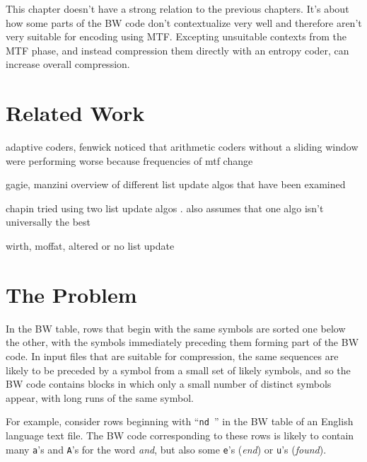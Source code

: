 \documentclass[a4paper]{scrreprt}
\begin{document}

This chapter doesn't have a strong relation to the previous chapters. It's about
how some parts of the BW code don't contextualize very well and therefore aren't
very suitable for encoding using MTF. Excepting unsuitable contexts from the MTF
phase, and instead compression them directly with an entropy coder, can increase
overall compression.

\section{Related Work}

adaptive coders, fenwick noticed that arithmetic coders without a sliding window
were performing worse because frequencies of mtf change\cite{fenwick1996block}

gagie, manzini overview of different list update algos that have been
examined\cite{gagie2007listupdate}

chapin tried using two list update algos
\cite{chapin2000switching,chapin2001diss}. also assumes that one algo isn't
universally the best

wirth, moffat, altered or no list update \cite{wirth2001ranks}

\section{The Problem}


In the BW table, rows that begin with the same symbols are sorted one below the
other, with the symbols immediately preceding them forming part of the BW code.
In input files that are suitable for compression, the same sequences are likely
to be preceded by a symbol from a small set of likely symbols, and so the BW
code contains blocks in which only a small number of distinct symbols appear,
with long runs of the same symbol.

For example, consider rows beginning with ``\texttt{nd }'' in the BW table of an
English language text file. The BW code corresponding to these rows is likely to
contain many \texttt{a}'s and \texttt{A}'s for the word \emph{and}, but also
some \texttt{e}'s (\emph{end}) or \texttt{u}'s (\emph{found}).
\end{document}
